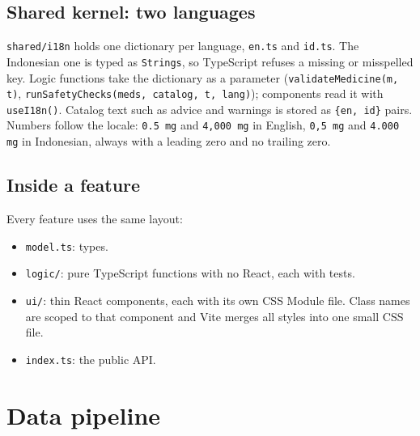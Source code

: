 \documentclass[11pt]{article}
\begin{document}
\subsection{Shared kernel: two languages}
\texttt{shared/i18n} holds one dictionary per language, \texttt{en.ts} and \texttt{id.ts}. The Indonesian one is typed as \texttt{Strings}, so TypeScript refuses a missing or misspelled key. Logic functions take the dictionary as a parameter (\texttt{validateMedicine(m, t)}, \texttt{runSafetyChecks(meds, catalog, t, lang)}); components read it with \texttt{useI18n()}. Catalog text such as advice and warnings is stored as \texttt{\{en, id\}} pairs. Numbers follow the locale: \texttt{0.5 mg} and \texttt{4,000 mg} in English, \texttt{0,5 mg} and \texttt{4.000 mg} in Indonesian, always with a leading zero and no trailing zero.

\subsection{Inside a feature}
Every feature uses the same layout:
\begin{itemize}
  \item \texttt{model.ts}: types.
  \item \texttt{logic/}: pure TypeScript functions with no React, each with tests.
  \item \texttt{ui/}: thin React components, each with its own CSS Module file. Class names are scoped to that component and Vite merges all styles into one small CSS file.
  \item \texttt{index.ts}: the public API.
\end{itemize}

\section{Data pipeline}
\begin{center}
\end{center}
\end{document}
